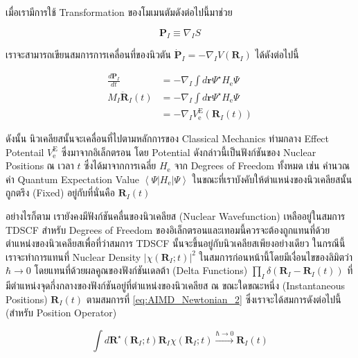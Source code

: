 เมื่อเรามีการใช้ Transformation ของโมเมนตัมดังต่อไปนี้มาช่วย

\begin{equation}
  \mathbf{P}_I \equiv \nabla_I S
\end{equation}

\noindent เราจะสามารถเขียนสมการการเคลื่อนที่ของนิวตัน $\dot{\mathbf{P}}_I = -\nabla_I V\left(\mathbf{R}_I\right)$
ได้ดังต่อไปนี้

\begin{align}
  \label{eq:AIMD_Newtonian_1}
  \frac{d \mathbf{P}_I}{d t} & =-\nabla_I \int d \mathbf{r} \Psi^{\star} H_{\mathrm{e}} \Psi      \\
  \label{eq:AIMD_Newtonian_2}
  M_I \ddot{\mathbf{R}}_I(t) & =-\nabla_I \int d \mathbf{r} \Psi^{\star} H_{\mathrm{e}} \Psi      \\
  \label{eq:AIMD_Newtonian_3}
                             & =-\nabla_I V_{\mathrm{e}}^{\mathrm{E}}\left(\mathbf{R}_I(t)\right)
\end{align}

ดังนั้น นิวเคลียสนั้นจะเคลื่อนที่ไปตามหลักการของ Classical Mechanics ท่ามกลาง Effect Potentail $V_{\mathrm{e}}^{\mathrm{E}}$
ซึ่งมาจากอิเล็กตรอน โดย Potential ดังกล่าวนี้เป็นฟังก์ชันของ Nuclear Positions ณ เวลา $t$ ซึ่งได้มาจากการเฉลี่ย
$H_{\mathrm{e}}$ จาก Degrees of Freedom ทั้งหมด เช่น คำนวณค่า Quantum Expectation Value
$\left\langle\Psi\left|H_{\mathrm{e}}\right| \Psi\right\rangle$ ในขณะที่เราบังคับให้ตำแหน่งของนิวเคลียสนั้นถูกตรึง (Fixed)
อยู่กับที่นั่นคือ $\mathbf{R}_I(t)$

อย่างไรก็ตาม เรายังคงมีฟังก์ชันคลื่นของนิวเคลียส (Nuclear Wavefunction) เหลืออยู่ในสมการ TDSCF สำหรับ Degrees of Freedom
ของอิเล็กตรอนและเทอมนี้ควรจะต้องถูกแทนที่ด้วยตำแหน่งของนิวเคลียสเพื่อที่ว่าสมการ TDSCF นั้นจะขึ้นอยู่กับนิวเคลียสเพียงอย่างเดียว
ในกรณีนี้เราจะทำการแทนที่ Nuclear Density $\left|\chi\left(\mathbf{R}_I ; t\right)\right|^2$
ในสมการก่อนหน้านี้โดยมีเงื่อนไขของลิมิตว่า $\hbar \rightarrow 0$ โดยแทนที่ด้วยผลคูณของฟังก์ชันเดลต้า (Delta Functions)
$\prod_I \delta\left(\mathbf{R}_I-\mathbf{R}_I(t)\right)$ ที่มีตำแหน่งจุดกึ่งกลางของฟังก์ชันอยู่ที่ตำแหน่งของนิวเคลียส ณ
ขณะใดขณะหนึ่ง (Instantaneous Positions) $\mathbf{R}_I(t)$ ตามสมการที่ \eqref{eq:AIMD_Newtonian_2}
ซึ่งเราจะได้สมการดังต่อไปนี้ (สำหรับ Position Operator)

\begin{equation}
  \int d \mathbf{R}^{\star}\left(\mathbf{R}_I ; t\right) \mathbf{R}_I \chi\left(\mathbf{R}_I ; t\right)
  \stackrel{\hbar \rightarrow 0}{\longrightarrow}
  \mathbf{R}_I(t)
\end{equation}

